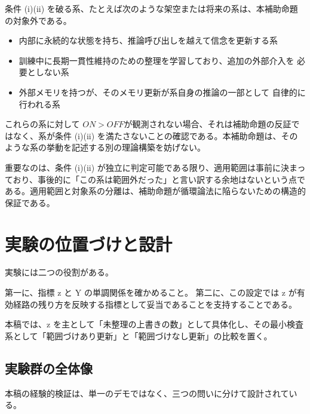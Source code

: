 \documentclass[12pt,a4paper]{article}
\begin{document}
条件 (i)(ii) を破る系、たとえば次のような架空または将来の系は、本補助命題の対象外である。

\begin{itemize}
\tightlist
\item
  内部に永続的な状態を持ち、推論呼び出しを越えて信念を更新する系
\item
  訓練中に長期一貫性維持のための整理を学習しており、追加の外部介入を 必要としない系
\item
  外部メモリを持つが、そのメモリ更新が系自身の推論の一部として 自律的に行われる系
\end{itemize}

これらの系に対して \(ON > OFF\)が観測されない場合、それは補助命題の反証ではなく、系が条件 (i)(ii) を満たさないことの確認である。本補助命題は、そのような系の挙動を記述する別の理論構築を妨げない。

重要なのは、条件 (i)(ii) が独立に判定可能である限り、適用範囲は事前に決まっており、事後的に「この系は範囲外だった」と言い訳する余地はないという点である。適用範囲と対象系の分離は、補助命題が循環論法に陥らないための構造的保証である。

\section{実験の位置づけと設計}\label{ux5b9fux9a13ux306eux4f4dux7f6eux3065ux3051ux3068ux8a2dux8a08}

実験には二つの役割がある。

第一に、指標 z と Y の単調関係を確かめること。 第二に、この設定では z が有効経路の残り方を反映する指標として妥当であることを支持することである。

本稿では、z を主として「未整理の上書きの数」として具体化し、その最小検査系として「範囲づけあり更新」と「範囲づけなし更新」の比較を置く。

\subsection{実験群の全体像}\label{ux5b9fux9a13ux7fa4ux306eux5168ux4f53ux50cf}

本稿の経験的検証は、単一のデモではなく、三つの問いに分けて設計されている。
\end{document}
